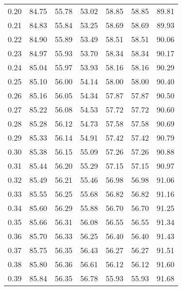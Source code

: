 \begin{tabular}{|c|c|c|c|c|c|c|}
      0.20 &     84.75 &     55.78 &      53.02 &   58.85 &      58.85 &         89.81 \\
      0.21 &     84.83 &     55.84 &      53.25 &   58.69 &      58.69 &         89.93 \\
      0.22 &     84.90 &     55.89 &      53.49 &   58.51 &      58.51 &         90.06 \\
      0.23 &     84.97 &     55.93 &      53.70 &   58.34 &      58.34 &         90.17 \\
      0.24 &     85.04 &     55.97 &      53.93 &   58.16 &      58.16 &         90.29 \\
      0.25 &     85.10 &     56.00 &      54.14 &   58.00 &      58.00 &         90.40 \\
      0.26 &     85.16 &     56.05 &      54.34 &   57.87 &      57.87 &         90.50 \\
      0.27 &     85.22 &     56.08 &      54.53 &   57.72 &      57.72 &         90.60 \\
      0.28 &     85.28 &     56.12 &      54.73 &   57.58 &      57.58 &         90.69 \\
      0.29 &     85.33 &     56.14 &      54.91 &   57.42 &      57.42 &         90.79 \\
      0.30 &     85.38 &     56.15 &      55.09 &   57.26 &      57.26 &         90.88 \\
      0.31 &     85.44 &     56.20 &      55.29 &   57.15 &      57.15 &         90.97 \\
      0.32 &     85.49 &     56.21 &      55.46 &   56.98 &      56.98 &         91.06 \\
      0.33 &     85.55 &     56.25 &      55.68 &   56.82 &      56.82 &         91.16 \\
      0.34 &     85.60 &     56.29 &      55.88 &   56.70 &      56.70 &         91.25 \\
      0.35 &     85.66 &     56.31 &      56.08 &   56.55 &      56.55 &         91.34 \\
      0.36 &     85.70 &     56.33 &      56.25 &   56.40 &      56.40 &         91.43 \\
      0.37 &     85.75 &     56.35 &      56.43 &   56.27 &      56.27 &         91.51 \\
      0.38 &     85.80 &     56.36 &      56.61 &   56.12 &      56.12 &         91.60 \\
      0.39 &     85.84 &     56.35 &      56.78 &   55.93 &      55.93 &         91.68 \\

\end{tabular}
